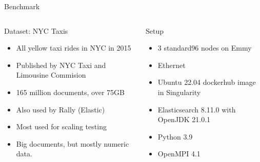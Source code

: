 \documentclass[compress,aspectratio=169]{beamer}
\begin{document}
  \begin{frame}{Benchmark}
    \begin{columns}
      \begin{column}{0.5\textwidth}
        \begin{block}{Dataset: NYC Taxis \cite{nyctaxis}}
          \begin{itemize}
            \item All yellow taxi rides in NYC in 2015
            \item Published by NYC Taxi and Limousine Commision \cite{tlcdata}
            \item 165 million documents, over 75GB
            \item Also used by Rally (Elastic)
            \item Most used for scaling testing
            \item Big documents, but mostly numeric data.
          \end{itemize}
        \end{block}
      \end{column}
      \begin{column}{0.5\textwidth}
        \begin{block}{Setup}
          \begin{itemize}
            \item 3 standard96 nodes on Emmy
            \item Ethernet
            \item Ubuntu 22.04 dockerhub image in Singularity
            \item Elasticsearch 8.11.0 with OpenJDK 21.0.1
            \item Python 3.9
            \item OpenMPI 4.1
          \end{itemize}
        \end{block}
      \end{column}
    \end{columns}
  \end{frame}
\end{document}
